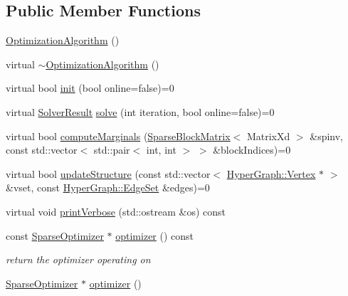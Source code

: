 \subsection*{Public Member Functions}
\begin{DoxyCompactItemize}
\item 
\hyperlink{classg2o_1_1OptimizationAlgorithm_a205013e0425b7bbae01cd16caf500ebb}{Optimization\+Algorithm} ()
\item 
virtual \hyperlink{classg2o_1_1OptimizationAlgorithm_af2516e3d66596ec9c9dfdd08d48e90f9}{$\sim$\+Optimization\+Algorithm} ()
\item 
virtual bool \hyperlink{classg2o_1_1OptimizationAlgorithm_af5b54ea6d40a8ab4c16d448ba02a0c80}{init} (bool online=false)=0
\item 
virtual \hyperlink{classg2o_1_1OptimizationAlgorithm_a705d58d7bc19528a8ab718570d090cdf}{Solver\+Result} \hyperlink{classg2o_1_1OptimizationAlgorithm_ab174deeeb2551ceaf715ea09f0f9c077}{solve} (int iteration, bool online=false)=0
\item 
virtual bool \hyperlink{classg2o_1_1OptimizationAlgorithm_a67b159f3a83471ba9ebcc0a9162a0e23}{compute\+Marginals} (\hyperlink{classg2o_1_1SparseBlockMatrix}{Sparse\+Block\+Matrix}$<$ Matrix\+Xd $>$ \&spinv, const std\+::vector$<$ std\+::pair$<$ int, int $>$ $>$ \&block\+Indices)=0
\item 
virtual bool \hyperlink{classg2o_1_1OptimizationAlgorithm_a6b86c5d3c56a41c18f2aee611b62d71b}{update\+Structure} (const std\+::vector$<$ \hyperlink{classg2o_1_1HyperGraph_1_1Vertex}{Hyper\+Graph\+::\+Vertex} $\ast$ $>$ \&vset, const \hyperlink{classg2o_1_1HyperGraph_a5e2970e236c0dcb4eff7c205d7b6b4ae}{Hyper\+Graph\+::\+Edge\+Set} \&edges)=0
\item 
virtual void \hyperlink{classg2o_1_1OptimizationAlgorithm_a61fe205d498ed3b0ac1f812a78c4b0f0}{print\+Verbose} (std\+::ostream \&os) const 
\item 
const \hyperlink{classg2o_1_1SparseOptimizer}{Sparse\+Optimizer} $\ast$ \hyperlink{classg2o_1_1OptimizationAlgorithm_ae1799d6aed633e94574072d26ed4cb4e}{optimizer} () const 
\begin{DoxyCompactList}\small\item\em return the optimizer operating on \end{DoxyCompactList}\item 
\hyperlink{classg2o_1_1SparseOptimizer}{Sparse\+Optimizer} $\ast$ \hyperlink{classg2o_1_1OptimizationAlgorithm_ac6ca7a2adbd25615be78316bc811a315}{optimizer} ()
\item 

\end{DoxyCompactItemize}
